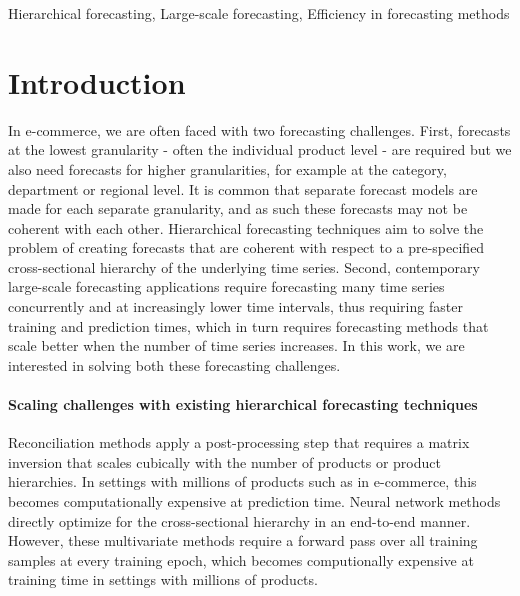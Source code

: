 \documentclass[preprint, 3p, times, twocolumn]{elsarticle}
\begin{document}
\begin{frontmatter}
\begin{abstract}
\end{abstract}

\begin{keyword}
  Hierarchical forecasting, Large-scale forecasting, Efficiency in forecasting methods
\end{keyword}

\end{frontmatter}

\section{Introduction} \label{sec:intro}
In e-commerce, we are often faced with two forecasting challenges. First, forecasts at the lowest granularity - often the individual product level - are required but we also need forecasts for higher granularities, for example at the category, department or regional level. It is common that separate forecast models are made for each separate granularity, and as such these forecasts may not be coherent with each other. Hierarchical forecasting techniques \cite{hyndman_optimal_2011} aim to solve the problem of creating forecasts that are coherent with respect to a pre-specified cross-sectional hierarchy of the underlying time series. Second, contemporary large-scale forecasting applications require forecasting many time series concurrently \cite{bose_probabilistic_2017} and at increasingly lower time intervals, thus requiring faster training and prediction times, which in turn requires forecasting methods that scale better when the number of time series increases. In this work, we are interested in solving both these forecasting challenges.

\paragraph{Scaling challenges with existing hierarchical forecasting techniques} Reconciliation methods \cite{hyndman_optimal_2011,athanasopoulos_forecasting_2017,wickramasuriya_optimal_2019} apply a post-processing step that requires a matrix inversion that scales cubically with the number of products or product hierarchies. In settings with millions of products such as in e-commerce, this becomes computationally expensive at prediction time. Neural network methods \cite{rangapuram_endtoend_2021} directly optimize for the cross-sectional hierarchy in an end-to-end manner. However, these multivariate methods require a forward pass over all training samples at every training epoch, which becomes computionally expensive at training time in settings with millions of products. 
  
\end{document}
